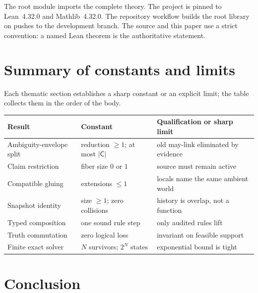 \documentclass[11pt]{article}
\theoremstyle{definition}
\theoremstyle{remark}
\newcommand{\Claims}{\mathsf C}
\begin{document}
The root module  imports the complete theory.  The project is
pinned to Lean~4.32.0 and Mathlib~4.32.0.  The repository workflow builds the
root library on pushes to the development branch.  The source and this paper
use a strict convention: a named Lean theorem is the authoritative statement.

\section{Summary of constants and limits}

Each thematic section establishes a sharp constant or an explicit limit; the
table collects them in the order of the body.

\begin{center}
\begin{tabular}{p{}p{}p{}}
\toprule
Result & Constant & Qualification or sharp limit \\
\midrule
Ambiguity-envelope split & reduction $\geq1$; at most $|\Claims|$ & old may-link eliminated by evidence \\
Claim restriction & fiber size $0$ or $1$ & source must remain active \\
Compatible gluing & extensions $\leq 1$ & locals name the same ambient world \\
Snapshot identity & size $\geq1$; zero collisions & history is overlap, not a function \\
Typed composition & one sound rule step & only audited rules lift \\
Truth commutation & zero logical loss & invariant on feasible support \\
Finite exact solver & $N$ survivors; $2^N$ states & exponential bound is tight \\
\bottomrule
\end{tabular}
\end{center}

\section{Conclusion}
\end{document}
